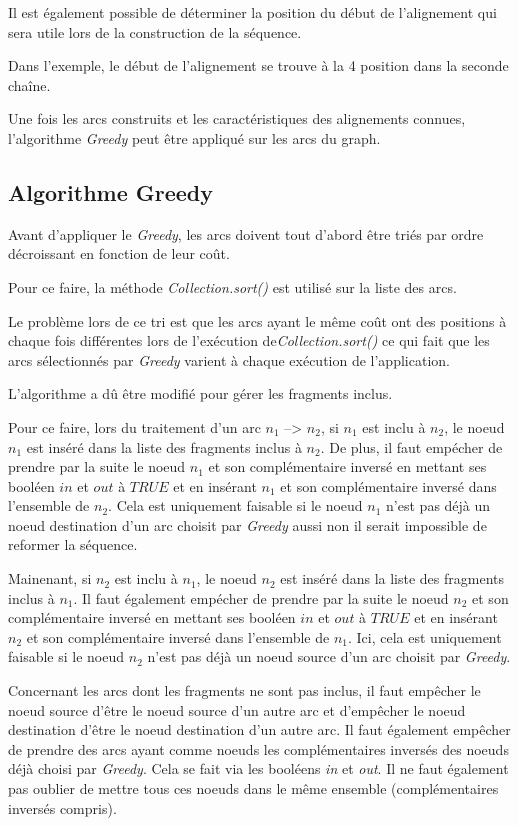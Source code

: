 \documentclass[12pt,a4paper,final]{article}
\begin{document}
Il est également possible de déterminer la position du début de l'alignement qui sera utile lors de la construction de la séquence.\medskip

Dans l'exemple, le début de l'alignement se trouve à la 4 position dans la seconde chaîne.\medskip

Une fois les arcs construits et les caractéristiques des alignements connues, l'algorithme \textit{Greedy} peut être appliqué sur les arcs du graph.\medskip

\subsection{Algorithme Greedy}

Avant d'appliquer le \textit{Greedy}, les arcs doivent tout d'abord être triés par ordre décroissant en fonction de leur coût.\medskip

Pour ce faire, la méthode \textit{Collection.sort()} est utilisé sur la liste des arcs.\medskip

Le problème lors de ce tri est que les arcs ayant le même coût ont des positions à chaque fois différentes lors de l'exécution de\textit{Collection.sort()} ce qui fait que les arcs sélectionnés par \textit{Greedy} varient à chaque exécution de l'application.\medskip

L'algorithme a dû être modifié pour gérer les fragments inclus.\medskip

Pour ce faire, lors du traitement d'un arc $n_1$ --> $n_2$, si $n_1$ est inclu à $n_2$, le noeud $n_1$ est inséré dans la liste des fragments inclus à $n_2$.  De plus, il faut empécher de prendre par la suite le noeud $n_1$ et son complémentaire inversé en mettant ses booléen $in$ et $out$ à $TRUE$ et en insérant $n_1$ et son complémentaire inversé dans l'ensemble de $n_2$.  Cela est uniquement faisable si le noeud $n_1$ n'est pas déjà un noeud destination d'un arc choisit par \textit{Greedy} aussi non il serait impossible de reformer la séquence. \medskip

Mainenant, si $n_2$ est inclu à $n_1$, le noeud $n_2$ est inséré dans la liste des fragments inclus à $n_1$.  Il faut également empécher de prendre par la suite le noeud $n_2$ et son complémentaire inversé en mettant ses booléen $in$ et $out$ à $TRUE$ et en insérant $n_2$ et son complémentaire inversé dans l'ensemble de $n_1$.  Ici, cela est uniquement faisable si le noeud $n_2$ n'est pas déjà un noeud source d'un arc choisit par \textit{Greedy}.\medskip

Concernant les arcs dont les fragments ne sont pas inclus, il faut empêcher le noeud source d'être le noeud source d'un autre arc et d'empêcher le noeud destination d'être le noeud destination d'un autre arc.  Il faut également empêcher de prendre des arcs ayant comme noeuds les complémentaires inversés des noeuds déjà choisi par \textit{Greedy}.  Cela se fait via les booléens \textit{in} et \textit{out}.  Il ne faut également pas oublier de mettre tous ces noeuds dans le même ensemble (complémentaires inversés compris).\medskip
\end{document}
